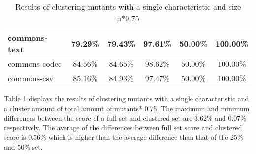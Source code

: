 \documentclass[../main]{subfiles}
\begin{document}
\begin{table}[!htb]
\begin{tabular}{|l|c|c|c|c|c|}
commons-text                  & 79.29\%                                                                                 & 79.43\%                                                                                     & 97.61\%                                                                              & 50.00\%                                                                               & 100.00\%                                                                             \\ \hline
commons-codec                 & 84.56\%                                                                                 & 84.65\%                                                                                     & 98.62\%                                                                              & 50.00\%                                                                               & 100.00\%                                                                             \\ \hline
commons-csv                   & 85.16\%                                                                                 & 84.93\%                                                                                     & 97.47\%                                                                              & 50.00\%                                                                               & 100.00\%                                                                             \\ \hline
\end{tabular}
\caption{\label{tab:clustering_single_75}Results of clustering mutants with a single characteristic and size n*0.75}
\end{table}
\FloatBarrier

Table \ref{tab:clustering_single_75} displays the results of clustering mutants with a single characteristic and a cluster amount of total amount of mutants* 0.75.  
The maximum and minimum differences between the score of a full set and clustered set are 3.62\% and 0.07\% respectively.  
The average of the differences between full set score and clustered score is 0.56\% which is higher than the average difference than that of the 25\% and 50\% set.
\end{document}
